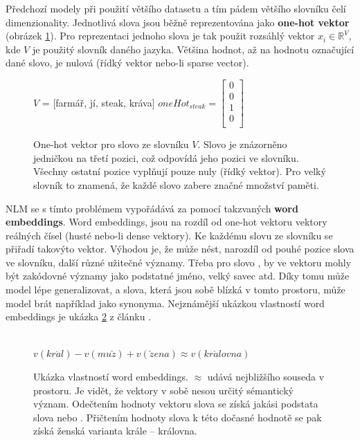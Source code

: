 Předchozí modely při použití většího datasetu a tím pádem většího slovníku čelí  dimenzionality. Jednotlivá slova jsou běžně reprezentována jako \textbf{one-hot vektor} (obrázek \ref{figure:oneHot}). Pro reprezentaci jednoho slova je tak použit rozsáhlý vektor $x_i \in \mathbb{R}^{V}$, kde $V$ je použitý slovník daného jazyka. Většina hodnot, až na hodnotu označující dané slovo, je nulová (řídký vektor nebo-li sparse vector).

\begin{figure}[H]
    \begin{center}
        $V$ = $[$farmář, jí, steak, kráva$]$ \quad
        $
        oneHot_{steak}=
        \begin{bmatrix}
            0 \\
            0 \\
            1 \\
            0 \\
        \end{bmatrix}
        $
    \end{center}
	\caption{One-hot vektor pro slovo  ze slovníku $V$. Slovo je znázorněno jedničkou na třetí pozici, což odpovídá jeho pozici ve slovníku. Všechny ostatní pozice vyplňují pouze nuly (řídký vektor). Pro velký slovník to znamená, že každé slovo zabere značné množství paměti.}
	\label{figure:oneHot}
\end{figure}


NLM se s tímto problémem vypořádává za pomocí takzvaných \textbf{word embeddings}. Word embeddings, jsou na rozdíl od one-hot vektoru vektory reálných čísel (husté nebo-li dense vektory). Ke každému slovu ze slovníku se přiřadí takovýto vektor. Výhodou je, že může nést, narozdíl od pouhé pozice slova ve slovníku, další různé užitečné významy. Třeba pro slovo , by ve vektoru mohly být zakódovné významy jako podstatné jméno, velký savec atd. Díky tomu může model lépe generalizovat, a slova, která jsou sobě blízká v tomto prostoru, může model brát například jako synonyma.
Nejznámější ukázkou vlastností word embeddings je ukázka \ref{figure:kingQueen} z článku \cite{kingQueen}. \\\\

\begin{figure}[H]
    \begin{center}
        $
          v(kr\acute{a}l) - v(mu\check{z}) + v(\check{z}ena) \approx v(kr\acute{a}lovna)
        $
    \end{center}
	\caption{Ukázka vlastností word embeddings. $\approx$ udává nejbližšího souseda v prostoru. Je vidět, že vektory v sobě nesou určitý sémantický význam. Odečtením hodnoty vektoru slova  se získá jakási podstata slova  nebo . Přičtením hodnoty slova  k této dočasné hodnotě se pak získá ženská varianta krále -- královna.}
	\label{figure:kingQueen}
\end{figure}


